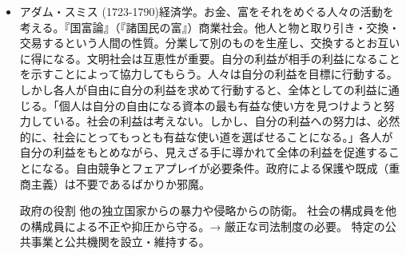 \documentclass[uplatex,dvipdfmx]{jsarticle} \usepackage{mystyle}%
\begin{document}
 \begin{itemize}
 \item アダム・スミス (1723-1790)経済学。お金、富をそれをめぐる人々の活動を考える。『国富論』（『諸国民の富』）商業社会。他人と物と取り引き・交換・交易するという人間の性質。分業して別のものを生産し、交換するとお互いに得になる。文明社会は互恵性が重要。自分の利益が相手の利益になることを示すことによって協力してもらう。人々は自分の利益を目標に行動する。しかし各人が自由に自分の利益を求めて行動すると、全体としての利益に通じる。「個人は自分の自由になる資本の最も有益な使い方を見つけようと努力している。社会の利益は考えない。しかし、自分の利益への努力は、必然的に、社会にとってもっとも有益な使い道を選ばせることになる。」各人が自分の利益をもとめながら、見えざる手に導かれて全体の利益を促進することになる。自由競争とフェアプレイが必要条件。政府による保護や既成（重商主義）は不要であるばかりか邪魔。

政府の役割
他の独立国家からの暴力や侵略からの防衛。
社会の構成員を他の構成員による不正や抑圧から守る。→ 厳正な司法制度の必要。
特定の公共事業と公共機関を設立・維持する。
 \end{itemize}





\ifx\mybook\undefined


\end{document}

